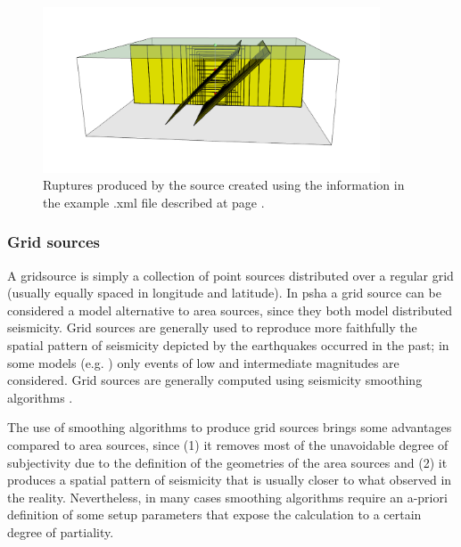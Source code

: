 \begin{figure}[!ht]
\centering
\includegraphics[width=10cm]{figures/hazard/pointsrc_2strike_2hypodep.pdf}
\caption{Ruptures produced by the source created using the information 
    in the example .xml file described at page \pageref{page:xml_point}.}
\label{fig:point_source_ruptures}
\end{figure}
%
\subsubsection{Grid sources}
\label{hazard:seismic_source_types:gridSources}
% 
A \gls{gridsource} is simply a collection of
point sources distributed over a regular grid (usually equally spaced in 
longitude and latitude).
%
In \gls{psha} a grid source can be considered a model alternative to area 
sources, since they both model distributed seismicity. 
%
Grid sources are generally used to reproduce more faithfully 
the spatial pattern of seismicity depicted by the earthquakes 
occurred in the past; in some models (e.g. \citet{petersen2008})
only events of low and intermediate magnitudes are considered. 
%
Grid sources are generally computed using seismicity smoothing algorithms 
\citep[][amongst many others]{frankel1995,woo1996}. 

The use of smoothing algorithms to produce grid sources brings some 
advantages compared to area sources, since (1) it removes most of the 
unavoidable degree of subjectivity due to 
the definition of the geometries of the area sources and (2) it produces
a spatial pattern of seismicity that is usually closer to what observed in 
the reality. 
Nevertheless, in many cases smoothing algorithms require an a-priori 
definition of some setup parameters that expose the calculation to a 
certain degree of partiality.


